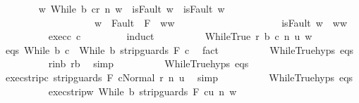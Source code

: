 \begin{isabellebody}
\ \ \ \ \ \ \isamarkupfalse%
\ {\isachardoublequoteopen}{\isasymexists}w{\isacharprime}{\isachardot}\ {\isasymGamma}{\isasymturnstile}{\isasymlangle}While\ b\ c{\isacharcomma}r{\isasymrangle}\ {\isacharequal}n{\isasymRightarrow}\ w{\isacharprime}\ {\isasymand}\ {\isacharparenleft}isFault\ w\ {\isasymlongrightarrow}\ isFault\ w{\isacharprime}{\isacharparenright}\ {\isasymand}\isanewline
\ \ \ \ \ \ \ \ \ \ \ \ \ \ \ \ \ \ \ {\isacharparenleft}w{\isacharprime}\ {\isasymin}\ Fault\ {\isacharbackquote}\ {\isacharparenleft}{\isacharminus}F{\isacharparenright}\ {\isasymlongrightarrow}\ w{\isacharprime}{\isacharequal}w{\isacharparenright}\ {\isasymand}\isanewline
\ \ \ \ \ \ \ \ \ \ \ \ \ \ \ \ \ \ \ {\isacharparenleft}{\isasymnot}\ isFault\ w{\isacharprime}\ {\isasymlongrightarrow}\ w{\isacharprime}{\isacharequal}w{\isacharparenright}{\isachardoublequoteclose}\isanewline
\ \ \ \ \ \ \ \ \isamarkupfalse%
\ exec{\isacharunderscore}c{\isacharprime}\ c{\isacharprime}\ \isanewline
\ \ \ \ \ \ \isamarkupfalse%
\ {\isacharparenleft}induct{\isacharparenright}\isanewline
\ \ \ \ \ \ \ \ \isamarkupfalse%
\ {\isacharparenleft}WhileTrue\ r\ b{\isacharprime}\ c{\isacharprime}{\isacharprime}\ n\ u\ w{\isacharparenright}\isanewline
\ \ \ \ \ \ \ \ \isamarkupfalse%
\ eqs{\isacharcolon}\ {\isachardoublequoteopen}While\ b{\isacharprime}\ c{\isacharprime}{\isacharprime}\ {\isacharequal}\ While\ b\ {\isacharparenleft}strip{\isacharunderscore}guards\ F\ c{\isacharparenright}{\isachardoublequoteclose}\ \isamarkupfalse%
\ fact\isanewline
\ \ \ \ \ \ \ \ \isamarkupfalse%
\ WhileTrue{\isachardot}hyps\ eqs\isanewline
\ \ \ \ \ \ \ \ \isamarkupfalse%
\ r{\isacharunderscore}in{\isacharunderscore}b{\isacharcolon}\ {\isachardoublequoteopen}r{\isasymin}b{\isachardoublequoteclose}\ \isamarkupfalse%
\ simp\isanewline
\ \ \ \ \ \ \ \ \isamarkupfalse%
\ WhileTrue{\isachardot}hyps\ eqs\isanewline
\ \ \ \ \ \ \ \ \isamarkupfalse%
\ exec{\isacharunderscore}strip{\isacharunderscore}c{\isacharcolon}\ {\isachardoublequoteopen}{\isasymGamma}{\isasymturnstile}{\isasymlangle}strip{\isacharunderscore}guards\ F\ c{\isacharcomma}Normal\ r{\isasymrangle}\ {\isacharequal}n{\isasymRightarrow}\ u{\isachardoublequoteclose}\ \isamarkupfalse%
\ simp\isanewline
\ \ \ \ \ \ \ \ \isamarkupfalse%
\ WhileTrue{\isachardot}hyps\ eqs\isanewline
\ \ \ \ \ \ \ \ \isamarkupfalse%
\ exec{\isacharunderscore}strip{\isacharunderscore}w{\isacharcolon}\ {\isachardoublequoteopen}{\isasymGamma}{\isasymturnstile}{\isasymlangle}While\ b\ {\isacharparenleft}strip{\isacharunderscore}guards\ F\ c{\isacharparenright}{\isacharcomma}u{\isasymrangle}\ {\isacharequal}n{\isasymRightarrow}\ w{\isachardoublequoteclose}\isanewline

\end{isabellebody}
